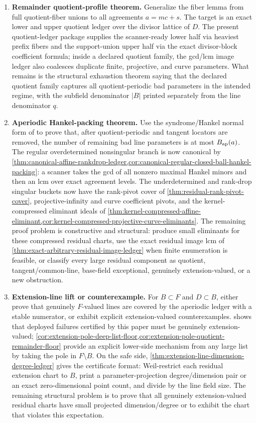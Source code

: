 \documentclass[11pt]{article}
\theoremstyle{definition}
\theoremstyle{remark}
\begin{document}
\begin{enumerate}[label=\textbf{T\arabic*.},leftmargin=2.5em]
\item \textbf{Remainder quotient-profile theorem.}  Generalize the fiber lemma
from full quotient-fiber unions to all agreements $a=mc+s$.  The target is an
exact lower and upper quotient ledger over the divisor lattice of $D$.  The present quotient-ledger package supplies the scanner-ready lower half via heaviest prefix fibers and the
support-union upper half via the exact divisor-block coefficient formula; inside
a declared quotient family, the gcd/lcm image ledger also coalesces duplicate
finite, projective, and curve parameters.  What remains is the structural
exhaustion theorem saying that the declared quotient family captures all
quotient-periodic bad parameters in the intended regime, with the subfield
denominator $|B|$ printed separately from the line denominator $q$.

\item \textbf{Aperiodic Hankel-packing theorem.}  Use the syndrome/Hankel normal
form of \cite{Cho26b} to prove that, after quotient-periodic and tangent
locators are removed, the number of remaining bad line parameters is at most
$B_{\rm ap}(a)$.  The regular overdetermined nonsingular branch is now
canonical by \cref{thm:canonical-affine-rankdrop-ledger,cor:canonical-regular-closed-ball-hankel-packing}: a scanner takes the gcd of all nonzero maximal
Hankel minors and then an lcm over exact agreement levels.  The underdetermined
and rank-drop singular buckets now have the rank-pivot cover of
\cref{thm:residual-rank-pivot-cover}, projective-infinity and curve coefficient
pivots, and the kernel-compressed eliminant ideals of
\cref{thm:kernel-compressed-affine-eliminant,cor:kernel-compressed-projective-curve-eliminants}.  The remaining proof problem is constructive and structural:
produce small eliminants for these compressed residual charts, use the exact
residual image lcm of \cref{thm:exact-arbitrary-residual-image-ledger} when
finite enumeration is feasible, or classify every large residual component as
quotient, tangent/common-line, base-field exceptional, genuinely extension-valued,
or a new obstruction.

\item \textbf{Extension-line lift or counterexample.}  For $B\subset F$ and
$D\subset B$, either prove that genuinely $F$-valued lines are covered by the
aperiodic ledger with a stable numerator, or exhibit explicit extension-valued
counterexamples.   shows that deployed failures certified by
this paper must be genuinely extension-valued; \cref{cor:extension-pole-deep-list-floor,cor:extension-pole-quotient-remainder-floor}
provide an explicit lower-side mechanism from any large list by taking the pole
in $F\setminus B$.  On the safe side,
\cref{thm:extension-line-dimension-degree-ledger} gives the certificate format:
Weil-restrict each residual extension chart to $B$, print a parameter-projection
degree/dimension pair or an exact zero-dimensional point count, and divide by the
line field size.  The remaining structural problem is to prove that all genuinely
extension-valued residual charts have small projected dimension/degree or to
exhibit the chart that violates this expectation.


\end{enumerate}
\end{document}
